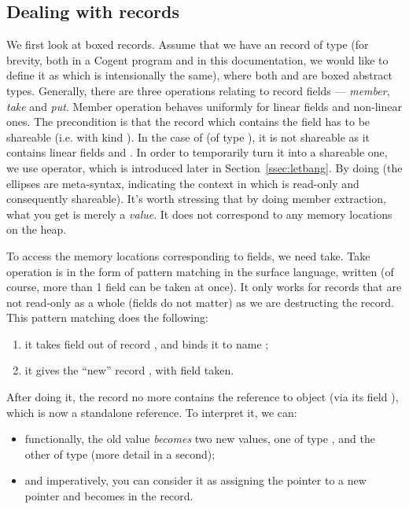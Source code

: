 \documentclass[a4paper]{article}
\newcommand{\cogent}{Cogent\xspace}
\begin{document}
\subsection{Dealing with records} \label{ssec:records}
We first look at boxed records. Assume that we have an record  of type  (for
brevity, both in a \cogent program and in this documentation, we would like to define it as  which is intensionally the same),
where both  and  are boxed abstract types. Generally, there are three operations relating to record fields --- \emph{member}, \emph{take} and \emph{put}.
Member operation behaves uniformly for linear fields and non-linear ones. The precondition is that the record which contains the field
has to be shareable (i.e. with kind ). In the case of  (of type ), it is not shareable as it contains linear fields  and .
In order to temporarily turn it into a shareable one, we use \code{!} operator, which is introduced later in Section~\ref{ssec:letbang}.
By doing  (the ellipses are meta-syntax, indicating the context in which  is read-only and consequently shareable).
It's worth stressing that by doing member extraction, what you get is merely a \emph{value}. It does not correspond to any memory locations on the heap.

To access the memory locations corresponding to fields, we need take. Take operation is in the form of pattern matching in the 
surface language, written  (of course, more than 1 field can be taken at once). 
It only works for records that are not read-only as a whole (fields do not matter) as we are destructing the
record.
This pattern matching does the following:
\begin{enumerate}
\item it takes field  out of record , and binds it to name ;
\item it gives the ``new'' record , with field  taken. 
\end{enumerate}
After doing it, the record  no more contains the reference to object  (via its field
), which is now a standalone reference.
To interpret it, we can:
\begin{itemize}
\item functionally, the old value  \emph{becomes} two new values, one of type , and the other of type
   (more detail in a second);
\item and imperatively, you can consider it as assigning the pointer to  a new pointer  and 
 becomes  in the record.
\end{itemize}
\end{document}
